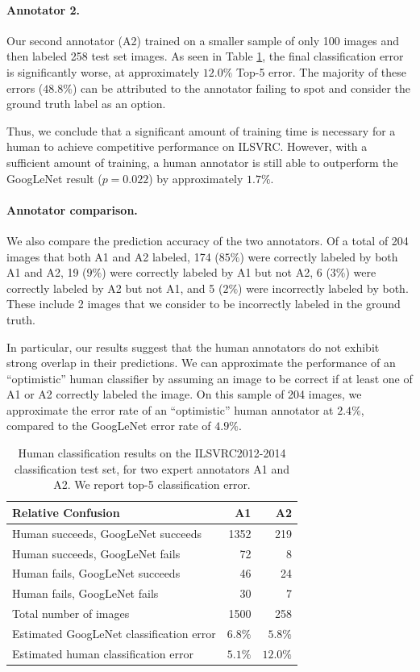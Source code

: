 \paragraph{Annotator 2.} Our second annotator (A2) trained on a smaller sample of only 100 images and then labeled 258 test set images. As seen in Table \ref{tab:humanresults}, the final classification error is significantly worse, at approximately $12.0\%$ Top-5 error. The majority of these errors ($48.8\%$) can be attributed to the annotator failing to spot and consider the ground truth label as an option.

Thus, we conclude that a significant amount of training time is necessary for a human to achieve competitive performance on ILSVRC. However, with a sufficient amount of training, a human annotator is still able to outperform the GoogLeNet result ($p = 0.022$) by approximately $1.7\%$.

\paragraph{Annotator comparison.} We also compare the prediction accuracy of the two annotators. Of a total of 204 images that both A1 and A2 labeled, 174 ($85\%$) were correctly labeled by both A1 and A2, 19 ($9\%$) were correctly labeled by A1 but not A2, 6 ($3\%$) were correctly labeled by A2 but not A1, and 5 ($2\%$) were incorrectly labeled by both. These include 2 images that we consider to be incorrectly labeled in the ground truth.

In particular, our results suggest that the human annotators do not exhibit strong overlap in their predictions. We can approximate the performance of an ``optimistic'' human classifier by assuming an image to be correct if at least one of A1 or A2 correctly labeled the image. On this sample of 204 images, we approximate the error rate of an ``optimistic'' human annotator at $2.4\%$, compared to the GoogLeNet error rate of $4.9\%$.

\begin{table}[t]
\resizebox{1\linewidth}{!} {
\begin{tabular}{|l|r|r|}
  \hline
  \textbf{Relative Confusion} & \textbf{A1} & \textbf{A2}\\
  \hline
  \hline
  Human succeeds, GoogLeNet succeeds & 1352 & 219 \\
  Human succeeds, GoogLeNet fails & 72 & 8 \\
  Human fails, GoogLeNet succeeds & 46 & 24 \\
  Human fails, GoogLeNet fails & 30 & 7 \\
  \hline
  Total number of images & 1500 & 258 \\
  \hline
  Estimated GoogLeNet classification error & $6.8\%$ & $5.8\%$\\
  Estimated human classification error & $5.1\%$ & $12.0\%$\\
  \hline
\end{tabular}
}
\caption{Human classification results on the ILSVRC2012-2014 classification test set, for two expert annotators A1 and A2. We report top-5 classification error.}
\label{tab:humanresults}
\end{table}

